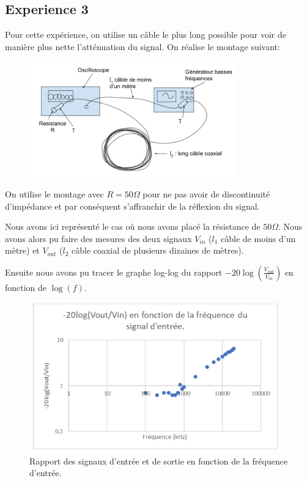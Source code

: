 \documentclass[12pt,a4paper, french]{article}
\begin{document}
   
    \subsection{Experience 3}
    
    Pour cette expérience, on utilise un câble le plus long possible pour
     voir de manière plus nette l’atténuation du signal. On réalise le montage suivant:
     \begin{figure}[!h]
        \begin{center}
                \includegraphics[width=9cm,height=5cm]{schemaexp3.png}
        \end{center}
        \end{figure}
    
    On utilise le montage avec $R=50\Omega $ pour ne pas avoir de discontinuité d’impédance et par conséquent 
    s’affranchir de la réflexion du signal. 
    
    Nous avons ici représenté le cas où nous avons placé la résistance de $50\Omega $.
    Nous avons alors pu faire des mesures des deux signaux $V_{in}$ ($l_1$ câble de moins d’un mètre) et
    $V_{out}$ ($l_2$ câble coaxial de plusieurs dizaines de mètres).
    
    Ensuite nous avons pu tracer le graphe log-log du rapport 
    $-20\log(\frac{V_{out}}{V_{in}})$ en fonction de $\log(f)$.
    \begin{figure}[!h]
        \begin{center}
                \includegraphics[width=11cm,height=6.5cm]{graphexp3.png}
                \caption{Rapport des signaux d'entrée et de sortie en fonction de la fréquence d'entrée.}
        \end{center}
        \end{figure}
    
\end{document}
